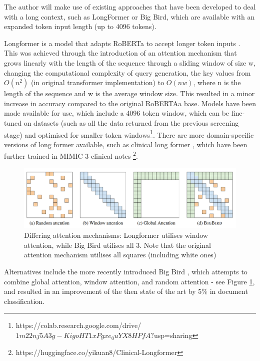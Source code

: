\documentclass[../main.tex]{subfiles}
\begin{document}
The author will make use of existing approaches that have been developed to deal with a long context, such as LongFormer or Big Bird, which are available with an expanded token input length (up to 4096 tokens).

Longformer is a model that adapts RoBERTa to accept longer token inputs \cite{beltagy_longformer_2020}. This was achieved through the introduction of an attention mechanism that grows linearly with the length of the sequence through a sliding window of size w, changing the computational complexity of query generation, the key values from \(O(n^2)\) (in original transformer implementation) to \(O(nw)\), where n is the length of the sequence and w is the average window size. This resulted in a minor increase in accuracy compared to the original RoBERTAa base. Models have been made available for use, which include a 4096 token window, which can be fine-tuned on datasets (such as all the data returned from the previous screening stage) and optimised for smaller token windows\footnote{https://colab.research.google.com/drive/$1m22nj5A3g-KigoHT1xPgxe_0uYX8HPfA?$usp=sharing}. There are more domain-specific versions of long former available, such as clinical long former \cite{li_comparative_2023}, which have been further trained in MIMIC 3 clinical notes \footnote{https://huggingface.co/yikuan8/Clinical-Longformer}.

\begin{figure}
    \centering
    \includegraphics[width=1\linewidth]{sections//images/Differing Attention Mechanisms.png}
    \caption{Differing attention mechanisms: Longformer utilises window attention, while Big Bird utilises all 3. Note that the original attention mechanism utilises all squares (including white ones)}
    \label{fig:attention_mechanism}
\end{figure}

Alternatives include the more recently introduced Big Bird \cite{zaheer_big_2021}, which attempts to combine global attention, window attention, and random attention - see Figure \ref{fig:attention_mechanism}, and resulted in an improvement of the then state of the art by 5\% in document classification. 
\end{document}
